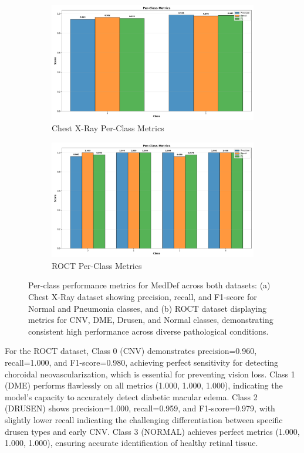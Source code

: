 \documentclass[preprint,12pt]{elsarticle}
\begin{document}
\begin{figure}[!t]
\centering
\begin{subfigure}[b]{0.45\columnwidth}
\centering
\includegraphics[width=\columnwidth]{fig/per-class/chest_xray.png}
\caption{Chest X-Ray Per-Class Metrics}
\end{subfigure}
\hfill
\begin{subfigure}[b]{0.45\columnwidth}
\centering
\includegraphics[width=\columnwidth]{fig/per-class/roct.png}
\caption{ROCT Per-Class Metrics}
\end{subfigure}
\caption{Per-class performance metrics for MedDef across both datasets: (a) Chest X-Ray dataset showing precision, recall, and F1-score for Normal and Pneumonia classes, and (b) ROCT dataset displaying metrics for CNV, DME, Drusen, and Normal classes, demonstrating consistent high performance across diverse pathological conditions.}
\label{fig:per_class_metrics}
\end{figure}

For the ROCT dataset, Class 0 (CNV) demonstrates precision=0.960, recall=1.000, and F1-score=0.980, achieving perfect sensitivity for detecting choroidal neovascularization, which is essential for preventing vision loss. Class 1 (DME) performs flawlessly on all metrics (1.000, 1.000, 1.000), indicating the model's capacity to accurately detect diabetic macular edema. Class 2 (DRUSEN) shows precision=1.000, recall=0.959, and F1-score=0.979, with slightly lower recall indicating the challenging differentiation between specific drusen types and early CNV. Class 3 (NORMAL) achieves perfect metrics (1.000, 1.000, 1.000), ensuring accurate identification of healthy retinal tissue.
\end{document}

